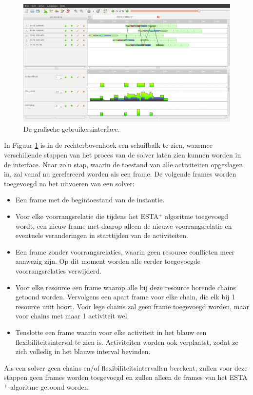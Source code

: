 \begin{figure}[H]
\centering
\includegraphics[width=.95\textwidth]{../images/GUIfinal.png}
\caption{De grafische gebruikersinterface.}
\label{fig:GUIfinal}
\end{figure}

In Figuur \ref{fig:GUIfinal} is in de rechterbovenhoek een schuifbalk te zien, waarmee verschillende stappen van het proces van de solver laten zien kunnen worden in de interface. Naar zo'n stap, waarin de toestand van alle activiteiten opgeslagen in, zal vanaf nu gerefereerd worden als een frame. De volgende frames worden toegevoegd na het uitvoeren van een solver:
\begin{itemize}
\item Een frame met de begintoestand van de instantie.
\item Voor elke voorrangsrelatie die tijdens het ESTA$^+$ algoritme toegevoegd wordt, een nieuw frame met daarop alleen de nieuwe voorrangsrelatie en eventuele veranderingen in starttijden van de activiteiten.
\item Een frame zonder voorrangsrelaties, waarin geen resource conflicten meer aanwezig zijn. Op dit moment worden alle eerder toegevoegde voorrangsrelaties verwijderd.
\item Voor elke resource een frame waarop alle bij deze resource horende chains getoond worden. Vervolgens een apart frame voor elke chain, die elk bij 1 resource unit hoort. Voor lege chains zal geen frame toegevoegd worden, maar voor chains met maar 1 activiteit wel.
\item Tenslotte een frame waarin voor elke activiteit in het blauw een flexibiliteitsinterval te zien is. Activiteiten worden ook verplaatst, zodat ze zich volledig in het blauwe interval bevinden.
\end{itemize}
Als een solver geen chains en/of flexibiliteitsintervallen berekent, zullen voor deze stappen geen frames worden toegevoegd en zullen alleen de frames van het ESTA$^+$-algoritme getoond worden.

